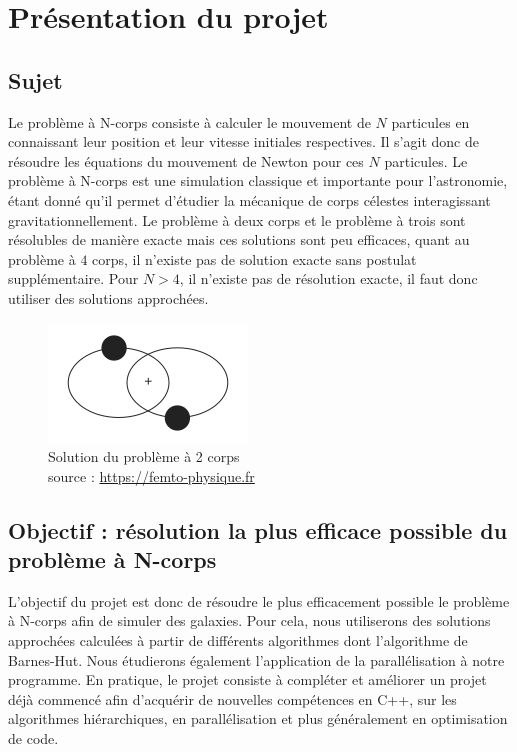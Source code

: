 \chapter{Présentation du projet}
\section{Sujet}
Le problème à N-corps consiste à calculer le mouvement de  $N$ particules en connaissant leur position et leur vitesse initiales respectives.
Il s'agit donc de résoudre les équations du mouvement de Newton pour ces $N$ particules.
Le problème à N-corps est une simulation classique et importante pour l'astronomie, étant donné qu'il permet d'étudier la mécanique de corps célestes interagissant gravitationnellement.
Le problème à deux corps et le problème à trois sont résolubles de manière exacte mais ces solutions sont peu efficaces, quant au problème à $4$ corps, il n'existe pas de solution exacte sans postulat supplémentaire. Pour $N>4$, il n'existe pas de résolution exacte, il faut donc utiliser des solutions approchées.

\begin{figure}[!h]
\begin{center}
\includegraphics[scale=0.8]{presentation/two.png}
\captionsetup{hypcap=false}
\caption{Solution du problème à 2 corps \\
source : \url{https://femto-physique.fr}}
\label{fig1}
\end{center}
\end{figure}

\section{Objectif : résolution la plus efficace possible du problème à N-corps}

L'objectif du projet est donc de résoudre le plus efficacement possible le problème à N-corps afin de simuler des galaxies.
Pour cela, nous utiliserons des solutions approchées calculées à partir de différents algorithmes dont l'algorithme de Barnes-Hut. Nous étudierons également l'application de la parallélisation à notre programme.
En pratique, le projet consiste à compléter et améliorer un projet déjà commencé afin d'acquérir de nouvelles compétences en C++, sur les algorithmes hiérarchiques, en parallélisation et plus généralement en optimisation de code.

